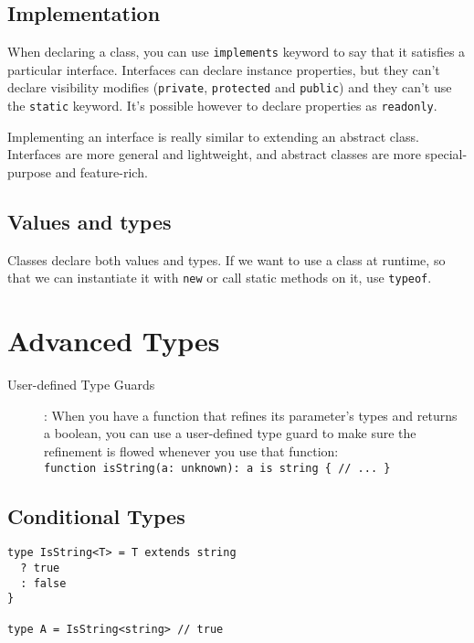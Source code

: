 \documentclass[french]{article}
\begin{document}
\subsection{Implementation}

When declaring a class, you can use \lstinline{implements} keyword to say that it satisfies a particular interface. Interfaces can declare instance properties, but they can't declare visibility modifies (\lstinline{private}, \lstinline{protected} and \lstinline{public}) and they can't use the \lstinline{static} keyword. It's possible however to declare properties as \lstinline{readonly}.


Implementing an interface is really similar to extending an abstract class. Interfaces are more general and lightweight, and abstract classes are more special-purpose and feature-rich.

\subsection{Values and types}

Classes declare both values and types. If we want to use a class at runtime, so that we can instantiate it with \lstinline{new} or call static methods on it, use \lstinline{typeof}.

\section{Advanced Types}

\begin{description}
  \item[User-defined Type Guards]: When you have a function that refines its parameter's types and returns a boolean, you can use a user-defined type guard to make sure the refinement is flowed whenever you use that function: \\ \lstinline|function isString(a: unknown): a is string { // ... }|
\end{description}

\subsection{Conditional Types}

\begin{lstlisting}
type IsString<T> = T extends string
  ? true
  : false
}

type A = IsString<string> // true
\end{lstlisting}
\end{document}
